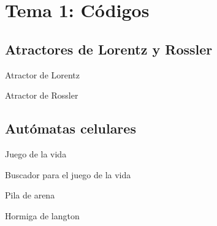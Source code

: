 \chapter{Tema 1: Códigos}

\section{Atractores de Lorentz y Rossler}

Atractor de Lorentz


Atractor de Rossler


\section{Autómatas celulares }

Juego de la vida 


Buscador para el juego de la vida


Pila de arena


Hormiga de langton

